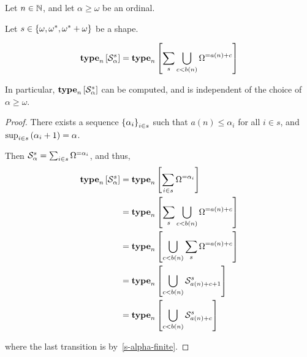 \begin{corollary}
    Let $n \in \mathbb{N}$, and let $\alpha \ge \omega$ be an ordinal.

    Let $s \in \left\{ {\omega, \omega^\ast, \omega^\ast + \omega} \right\}$ be a shape.

    \[
        \mathbf{type}_{n} \left[ {\mathcal{S}^{s}_{\alpha}} \right]
        = \mathbf{type}_{n} \left[ {\sum_{s} {\bigcup_{c < b(n)}{\Omega^{= a(n) + c}}}} \right]
    \]

    In particular, $\mathbf{type}_{n} \left[ {\mathcal{S}^{s}_{\alpha}} \right]$ can be
    computed, and is independent of the choice of $\alpha \ge \omega$.
\end{corollary}

\begin{proof}
    There exists a sequence $\left\{ {\alpha_i} \right\}_{i \in s}$ such that
    $a(n) \le \alpha_i$ for all $i \in s$,
    and $\sup_{i \in s} \left( {\alpha_i + 1} \right) = \alpha$.

    Then $\mathcal{S}^{s}_{\alpha} = \sum_{i \in s} \Omega^{= \alpha_i}$,
    and thus,
    \begin{align*}
        \mathbf{type}_{n} \left[ {\mathcal{S}^{s}_{\alpha}} \right]
        &= \mathbf{type}_{n} \left[ {\sum_{i \in s} \Omega^{= \alpha_i}} \right] \\
        &= \mathbf{type}_{n} \left[ {\sum_{s} \bigcup_{c < b(n)}{\Omega^{= a(n) + c}}} \right] \\
        &= \mathbf{type}_{n} \left[ {\bigcup_{c < b(n)}{\sum_{s} \Omega^{= a(n) + c}}} \right] \\
        &= \mathbf{type}_{n} \left[ {\bigcup_{c < b(n)}{\mathcal{S}^{s}_{a(n) + c + 1}}} \right] \\
        &= \mathbf{type}_{n} \left[ {\bigcup_{c < b(n)}{\mathcal{S}^{s}_{a(n) + c}}} \right] \\
    \end{align*}

    where the last transition is by~\cref{s-alpha-finite}.

\end{proof}



